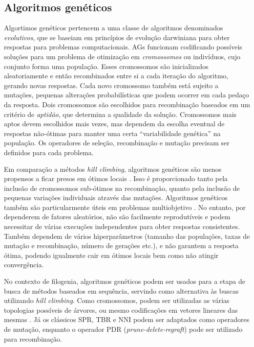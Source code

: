 \documentclass[12pt]{article}
\begin{document}
\subsection{Algoritmos genéticos}

Algortimos genéticos pertencem a uma classe de algoritmos denominados \emph{evolutivos}, que se baseiam em princípios de evolução darwiniana para obter respostas para problemas computacionais. AGs funcionam codificando possíveis soluções para um problema de otimização em \emph{cromossomos} ou indivíduos, cujo conjunto forma uma população. Esses cromossomos são inicializados aleatoriamente e então recombinados entre si a cada iteração do algoritmo, gerando novas respostas. Cada novo cromossomo também está sujeito a mutações, pequenas alterações probabilísticas que podem ocorrer em cada pedaço da resposta. Dois cromossomos são escolhidos para recombinação baseados em um critério de \emph{aptidão}, que determina a qualidade da solução. Cromossomos mais aptos devem escolhidos mais vezes, mas dependem da escolha eventual de respostas não-ótimas para manter uma certa ``variabilidade genética'' na população. Os operadores de seleção, recombinação e mutação precisam ser definidos para cada problema.

Em comparação a métodos \emph{hill climbing}, algoritmos genéticos são menos propensos a ficar presos em ótimos locais \cite{garli}. Isso é proporcionado tanto pela inclusão de cromossomos sub-ótimos na recombinação, quanto pela inclusão de pequenas variações individuais através das mutações. Algoritmos genéticos também são particularmente úteis em problemas multiobjetivo \cite{mo-phylogenetics}.
No entanto, por dependerem de fatores aleatórios, não são facilmente reprodutíveis e podem necessitar de várias execuções independentes para obter respostas consistentes. Também dependem de vários hiperparâmetros (tamanho das populações, taxas de mutação e recombinação, número de gerações etc.), e não garantem a resposta ótima, podendo igualmente cair em ótimos locais bem como não atingir convergência.

No contexto de filogenia, algoritmos genéticos podem ser usados para a etapa de busca de métodos baseados em sequência, servindo como alternativa às buscas utilizando \emph{hill climbing}. Como cromossomos, podem ser utilizadas as várias topologias possíveis de árvores, ou mesmo codificações em vetores lineares das mesmas \cite{cotta2002inferring}. Já os clássicos SPR, TBR e NNI podem ser adaptados como operadores de mutação, enquanto o operador PDR (\emph{prune-delete-regraft}) pode ser utilizado para recombinação.
\end{document}
